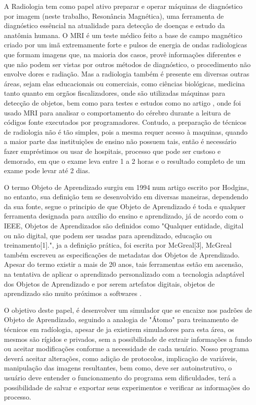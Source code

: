 \documentclass[12pt,openright,oneside,a4paper,english,french,spanish,brazil]{unifil}
\begin{document}
A Radiologia tem como papel ativo preparar e operar máquinas de diagnóstico por imagem (neste trabalho, Resonância Magnética), uma ferramenta de diagnóstico essêncial na atualidade para detecção de doenças e estudo da anatômia humana. O MRI é um teste médico feito a base de campo magnético criado por um imã extremamente forte e pulsos de energia de ondas radiologicas que formam imagens que, na maioria dos casos, provê informações diferentes e que não podem ser vistas por outros métodos de diagnóstico, o procedimento não envolve dores e radiação. Mas a radiologia também é presente em diversas outras áreas, sejam elas educacionais ou comerciais, como ciências biológicas, medicina tanto quanto em orgãos fiscalizadores, onde são utilizadas máquinas para detecção de objetos, bem como para testes e estudos como no artigo \citeyear{ABNTEX2:2014}, onde foi usado MRI para analisar o comportamento do cérebro durante a leitura de códigos fonte executados por programadores. Contudo, a preparação de técnicos de radiologia não é tão simples, pois a mesma requer acesso à maquinas, quando a maior parte das instituições de ensino não possuem tais, então é necessário fazer empréstimos ou usar de hospitais, processo que pode ser custoso e demorado, em que o exame leva entre 1 a 2 horas e o resultado completo de um exame pode levar até 2 dias.

O termo Objeto de Aprendizado surgiu em 1994  num artigo escrito por Hodgins, no entanto, sua definição tem se desenvolvido em diversas maneiras, dependendo da sua fonte, segue o principio de que Objeto de Aprendizado é toda e qualquer ferramenta designada para auxílio do ensino e aprendizado, já de acordo com o IEEE, Objetos de Aprendizados são definidos como "Qualquer entidade, digital ou não digital, que podem ser usadas para aprendizado, educação ou treinamento[1].", ja a definição prática, foi escrita por McGreal[3], McGreal também escreveu as especificações de metadatas dos Objetos de Aprendizado. Apesar do termo existir a mais de 20 anos, tais ferramentas estão em ascensão, na tentativa de aplicar o aprendizado personalizado com a tecnologia adaptável dos Objetos de Aprendizado e por serem artefatos digitais, objetos de aprendizado são muito próximos a softwares \citeyear{Braga:2012}. 	 
	
	O objetivo deste papel, é desenvolver um simulador que se encaixe nos padrões de Objeto de Aprendizado, seguindo a analogia de "Átomo" para treinamento de técnicos em radíologia, apesar de ja existirem simuladores para esta área, os mesmos são rígidos e privados, sem a possibilidade de extrair informações a fundo ou aceitar modificações conforme a necessidade de cada usuário. Nosso programa deverá aceitar alterações, como adição de protocolos, implicação de variáveis, manipulação das imagens resultantes, bem como, deve ser autoinstrutivo, o usuário deve entender o funcionamento do programa sem dificuldades, terá a possibilidade de salvar e exportar seus experimentos e verificar as informações do processo.
\end{document}
